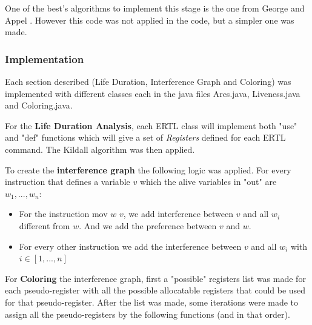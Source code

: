 \documentclass[conference]{IEEEtran}
\theoremstyle{definition}
\begin{document}
One of the best's algorithms to implement this stage is the one from George and Appel \cite{COLORING}. However this code was not applied in the code, but a simpler one was made.

\subsubsection{Implementation}

Each section described (Life Duration, Interference Graph and Coloring) was implemented with different classes each in the java files Arcs.java, Liveness.java and Coloring.java.

For the \textbf{Life Duration Analysis}, each ERTL class will implement both "use" and "def" functions which will give a set of \textit{Registers} defined for each ERTL command.
The Kildall algorithm was then applied.

To create the \textbf{interference graph} the following logic was applied. For every instruction that defines a variable $v$  which the alive variables in "out" are \(w_{1}, ..., w_{n}\):
\begin{itemize}
	\item For the instruction mov $w$ $v$, we add interference between $v$ and all $w_{i}$ different from $w$. And we add the preference between $v$ and $w$.
	\item For every other instruction we add the interference between $v$ and all $w_{i}$ with \(i \in [1, ..., n]\) 
\end{itemize}

For \textbf{Coloring} the interference graph, first a "possible" registers list was made for each pseudo-register with all the possible allocatable registers that could be used for that pseudo-register. After the list was made, some iterations were made to assign all the pseudo-registers by the following functions (and in that order).
\end{document}
